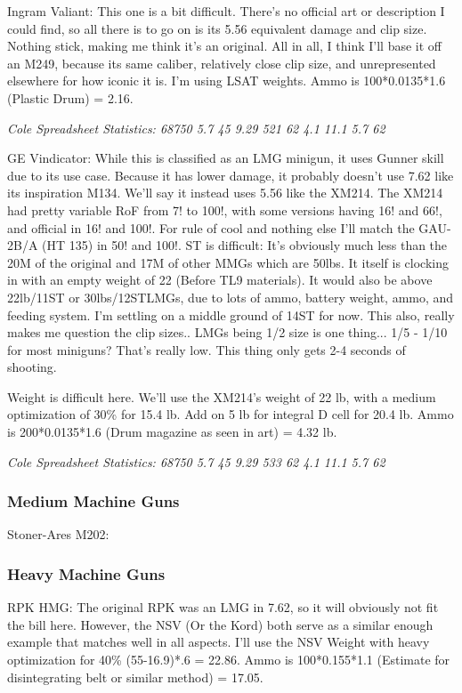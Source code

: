 \begin{multicols*}{2}
	Ingram Valiant: This one is a bit difficult. There's no official art or description I could find, so all there is to go on is its 5.56 equivalent damage and clip size. Nothing stick, making me think it's an original. All in all, I think I'll base it off an M249, because its same caliber, relatively close clip size, and unrepresented elsewhere for how iconic it is. I'm using LSAT weights. Ammo is 100*0.0135*1.6 (Plastic Drum) = 2.16.
	
	\textit{\textcolor{OliveGreen}{Cole Spreadsheet Statistics: 68750 5.7 45 9.29 521 62 4.1 11.1 5.7 62}}
	
	GE Vindicator: While this is classified as an LMG minigun, it uses Gunner skill due to its use case. Because it has lower damage, it probably doesn't use 7.62 like its inspiration M134. We'll say it instead uses 5.56 like the XM214. The XM214 had pretty variable RoF from 7! to 100!, with some versions having 16! and 66!, and official in 16! and 100!. For rule of cool and nothing else I'll match the GAU-2B/A (HT 135) in 50! and 100!. ST is difficult: It's obviously much less than the 20M of the original and 17M of other MMGs which are 50lbs. It itself is clocking in with an empty weight of 22 (Before TL9 materials). It would also be above 22lb/11ST  or 30lbs/12STLMGs, due to lots of ammo, battery weight, ammo, and feeding system. I'm settling on a middle ground of 14ST for now. This also, really makes me question the clip sizes.. LMGs being 1/2 size is one thing... 1/5 - 1/10 for most miniguns? That's really low. This thing only gets 2-4 seconds of shooting.
	
	Weight is difficult here. We'll use the XM214's weight of 22 lb, with a medium optimization of 30\% for 15.4 lb. Add on 5 lb for integral D cell for 20.4 lb. Ammo is 200*0.0135*1.6 (Drum magazine as seen in art) = 4.32 lb.
	
	\textit{\textcolor{OliveGreen}{Cole Spreadsheet Statistics: 68750 5.7 45 9.29 533 62 4.1 11.1 5.7 62}}
	
	\subsubsection{Medium Machine Guns}
	
	Stoner-Ares M202:
	
	\subsubsection{Heavy Machine Guns}
	
	RPK HMG: The original RPK was an LMG in 7.62, so it will obviously not fit the bill here. However, the NSV (Or the Kord) both serve as a similar enough example that matches well in all aspects. I'll use the NSV Weight with heavy optimization for 40\% (55-16.9)*.6 = 22.86. Ammo is  100*0.155*1.1 (Estimate for disintegrating belt or similar method) = 17.05.
	

\end{multicols*}
